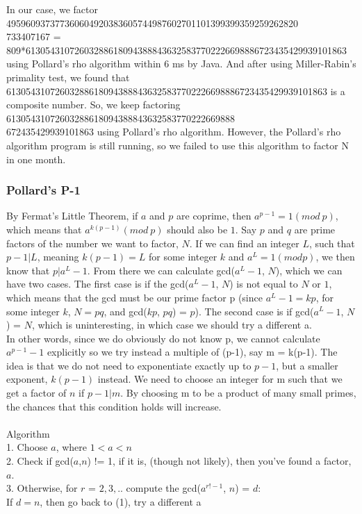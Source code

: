 \documentclass[12pt]{article} %
\begin{document}
	In our case, we factor 495960937377360604920383605744987602701101399399359259262820\\733407167 = 809*613054310726032886180943888436325837702226698886723435429939101863 using Pollard's rho algorithm within 6 ms by Java.
	And after using Miller-Rabin's primality test, we found that 613054310726032886180943888436325837702226698886723435429939101863 is a composite number.
	So, we keep factoring 61305431072603288618094388843632583770222669888\\672435429939101863 using Pollard's rho algorithm.
	However, the Pollard's rho algorithm program is still running, so we failed to use this algorithm to factor N in one month.
	\subsubsection{Pollard's P-1}
	By Fermat’s Little Theorem, if $a$ and $p$ are coprime, then $a^{p-1} = 1(mod\ p)$, which means that $a^{k(p-1)} (mod\ p)$ should also be $1$. Say $p$ and $q$ are prime factors of the number we want to factor, $N$. If we can find an integer $L$, such that $p-1| L$, meaning $k(p-1) = L$ for some integer $k$ and $a^{L} = 1(mod p)$, we then know that $p|a^{L}-1$. From there we can calculate gcd($a^{L}-1$, $N$), which we can have two cases. The first case is if the gcd($a^{L}-1$, $N$) is not equal to $N$ or $1$, which means that the gcd must be our prime factor p (since $a^{L}-1 = kp$, for some integer $k$, $N = pq$, and gcd($kp$, $pq$) = $p$). The second case is if gcd($a^{L}-1$, $N$) = $N$, which is uninteresting, in which case we should try a different a.
	\\In other words, since we do obviously do not know p, we cannot calculate $a^{p-1}-1$ explicitly so we try instead a multiple of (p-1), say m = k(p-1). The idea is that we do not need to exponentiate exactly up to $p-1$, but a smaller exponent, $k(p-1)$ instead. We need to choose an integer for m such that we get a factor of $n$ if $p-1|m$. By choosing m to be a product of many small primes, the chances that this condition holds will increase.\cite{charest}
	\\\\Algorithm 
	\\1. Choose $a$, where $1<a<n$
	\\2. Check if gcd($a$,$n$) != 1, if it is, (though not likely), then you’ve found a factor, $a$.
	\\3. Otherwise, for $r$ = $2,3,..$ compute the gcd($a^{r!-1}$, $n$) = $d$:
	\\If $d = n$, then go back to (1), try a different a
\end{document}
